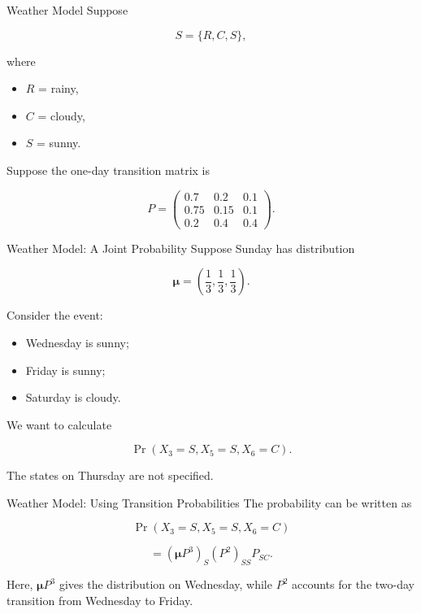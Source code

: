 \documentclass[
  ignorenonframetext,
  aspectratio=169,
]{beamer}
\providecommand{\tightlist}{%
  \setlength{\itemsep}{0pt}\setlength{\parskip}{0pt}}
\begin{document}
\begin{frame}{Weather Model}
\protect{}\label{weather-model-1}
Suppose

\[
S=\{R,C,S\},
\]

where

\begin{itemize}
\tightlist
\item
  \(R\) = rainy,
\item
  \(C\) = cloudy,
\item
  \(S\) = sunny.
\end{itemize}

Suppose the one-day transition matrix is

\[
P=
\begin{pmatrix}
0.7&0.2&0.1\\
0.75&0.15&0.1\\
0.2&0.4&0.4
\end{pmatrix}.
\]
\end{frame}

\begin{frame}{Weather Model: A Joint Probability}
\protect{}\label{weather-model-a-joint-probability}
Suppose Sunday has distribution

\[
\boldsymbol{\mu}
=
\left(\frac13,\frac13,\frac13\right).
\]

Consider the event:

\begin{itemize}
\tightlist
\item
  Wednesday is sunny;
\item
  Friday is sunny;
\item
  Saturday is cloudy.
\end{itemize}

We want to calculate

\[
\Pr(X_3=S,X_5=S,X_6=C).
\]

The states on Thursday are not specified.
\end{frame}

\begin{frame}{Weather Model: Using Transition Probabilities}
\protect{}\label{weather-model-using-transition-probabilities}
The probability can be written as

\[
\Pr(X_3=S,X_5=S,X_6=C)
\]

\[
=
(\boldsymbol{\mu}P^3)_S
(P^2)_{SS}
P_{SC}.
\]

Here, \(\boldsymbol{\mu}P^3\) gives the distribution on Wednesday, while
\(P^2\) accounts for the two-day transition from Wednesday to Friday.
\end{frame}
\end{document}
